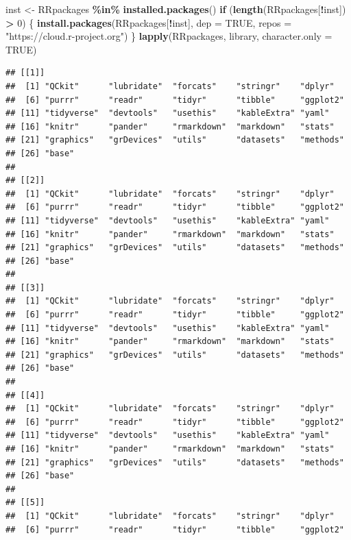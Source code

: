 \documentclass[
]{article}
\newenvironment{Shaded}{\begin{snugshade}}{\end{snugshade}}
\newcommand{\AttributeTok}[1]{\textcolor[rgb]{0.13,0.29,0.53}{#1}}
\newcommand{\ConstantTok}[1]{\textcolor[rgb]{0.56,0.35,0.01}{#1}}
\newcommand{\ControlFlowTok}[1]{\textcolor[rgb]{0.13,0.29,0.53}{\textbf{#1}}}
\newcommand{\DecValTok}[1]{\textcolor[rgb]{0.00,0.00,0.81}{#1}}
\newcommand{\FunctionTok}[1]{\textcolor[rgb]{0.13,0.29,0.53}{\textbf{#1}}}
\newcommand{\NormalTok}[1]{#1}
\newcommand{\OtherTok}[1]{\textcolor[rgb]{0.56,0.35,0.01}{#1}}
\newcommand{\SpecialCharTok}[1]{\textcolor[rgb]{0.81,0.36,0.00}{\textbf{#1}}}
\newcommand{\StringTok}[1]{\textcolor[rgb]{0.31,0.60,0.02}{#1}}
\begin{document}
\begin{Shaded}
\begin{Highlighting}[]
\NormalTok{inst }\OtherTok{\textless{}{-}}\NormalTok{ RRpackages }\SpecialCharTok{\%in\%} \FunctionTok{installed.packages}\NormalTok{()}
\ControlFlowTok{if}\NormalTok{ (}\FunctionTok{length}\NormalTok{(RRpackages[}\SpecialCharTok{!}\NormalTok{inst]) }\SpecialCharTok{\textgreater{}} \DecValTok{0}\NormalTok{) \{}
  \FunctionTok{install.packages}\NormalTok{(RRpackages[}\SpecialCharTok{!}\NormalTok{inst], }\AttributeTok{dep =} \ConstantTok{TRUE}\NormalTok{, }\AttributeTok{repos =} \StringTok{"https://cloud.r{-}project.org"}\NormalTok{)}
\NormalTok{\}}
\FunctionTok{lapply}\NormalTok{(RRpackages, library, }\AttributeTok{character.only =} \ConstantTok{TRUE}\NormalTok{)}
\end{Highlighting}
\end{Shaded}

\begin{verbatim}
## [[1]]
##  [1] "QCkit"      "lubridate"  "forcats"    "stringr"    "dplyr"     
##  [6] "purrr"      "readr"      "tidyr"      "tibble"     "ggplot2"   
## [11] "tidyverse"  "devtools"   "usethis"    "kableExtra" "yaml"      
## [16] "knitr"      "pander"     "rmarkdown"  "markdown"   "stats"     
## [21] "graphics"   "grDevices"  "utils"      "datasets"   "methods"   
## [26] "base"      
## 
## [[2]]
##  [1] "QCkit"      "lubridate"  "forcats"    "stringr"    "dplyr"     
##  [6] "purrr"      "readr"      "tidyr"      "tibble"     "ggplot2"   
## [11] "tidyverse"  "devtools"   "usethis"    "kableExtra" "yaml"      
## [16] "knitr"      "pander"     "rmarkdown"  "markdown"   "stats"     
## [21] "graphics"   "grDevices"  "utils"      "datasets"   "methods"   
## [26] "base"      
## 
## [[3]]
##  [1] "QCkit"      "lubridate"  "forcats"    "stringr"    "dplyr"     
##  [6] "purrr"      "readr"      "tidyr"      "tibble"     "ggplot2"   
## [11] "tidyverse"  "devtools"   "usethis"    "kableExtra" "yaml"      
## [16] "knitr"      "pander"     "rmarkdown"  "markdown"   "stats"     
## [21] "graphics"   "grDevices"  "utils"      "datasets"   "methods"   
## [26] "base"      
## 
## [[4]]
##  [1] "QCkit"      "lubridate"  "forcats"    "stringr"    "dplyr"     
##  [6] "purrr"      "readr"      "tidyr"      "tibble"     "ggplot2"   
## [11] "tidyverse"  "devtools"   "usethis"    "kableExtra" "yaml"      
## [16] "knitr"      "pander"     "rmarkdown"  "markdown"   "stats"     
## [21] "graphics"   "grDevices"  "utils"      "datasets"   "methods"   
## [26] "base"      
## 
## [[5]]
##  [1] "QCkit"      "lubridate"  "forcats"    "stringr"    "dplyr"     
##  [6] "purrr"      "readr"      "tidyr"      "tibble"     "ggplot2"   

\end{verbatim}
\end{document}
